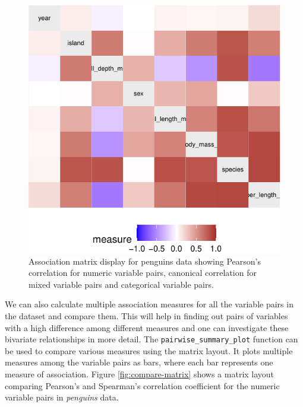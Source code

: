 \begin{Schunk}
\begin{figure}

{\centering \includegraphics{rj_paper_files/figure-latex/assoc-heatmap-1} 

}

\caption[Association matrix display for penguins data showing Pearson's correlation for numeric variable pairs, canonical correlation for mixed variable pairs and categorical variable pairs]{Association matrix display for penguins data showing Pearson's correlation for numeric variable pairs, canonical correlation for mixed variable pairs and categorical variable pairs.}\label{fig:assoc-heatmap}
\end{figure}
\end{Schunk}

We can also calculate multiple association measures for all the variable
pairs in the dataset and compare them. This will help in finding out
pairs of variables with a high difference among different measures and
one can investigate these bivariate relationships in more detail. The
\texttt{pairwise\_summary\_plot} function can be used to compare various
measures using the matrix layout. It plots multiple measures among the
variable pairs as bars, where each bar represents one measure of
association. Figure \ref{fig:compare-matrix} shows a matrix layout
comparing Pearson's and Spearman's correlation coefficient for the
numeric variable pairs in \emph{penguins} data.

